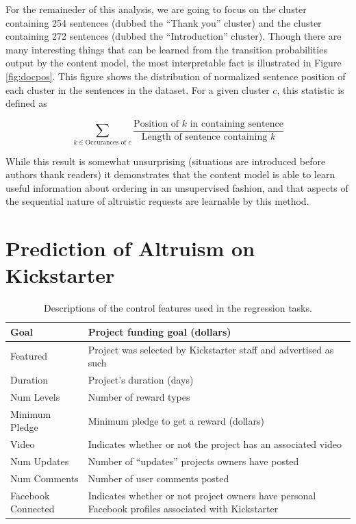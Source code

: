 \documentclass[letterpaper]{article}
\begin{document}
For the remaineder of this analysis, we are going to focus on the cluster containing 254 sentences (dubbed the ``Thank you'' cluster) and the cluster containing 272 sentences (dubbed the ``Introduction'' cluster). Though there are many interesting things that can be learned from the transition probabilities output by the content model, the most interpretable fact is illustrated in Figure \ref{fig:docpos}. This figure shows the distribution of normalized sentence position of each cluster in the sentences in the dataset. For a given cluster $c$, this statistic is defined as

\begin{equation} \label{eq:sentpos}
\sum\limits_{k \in \text{Occurances of $c$}} \frac{\text{Position of $k$ in containing sentence}}{\text{Length of sentence containing $k$}}
\end{equation}

While this result is somewhat unsurprising (situations are introduced before authors thank readers) it demonstrates that the content model is able to learn useful information about ordering in an unsupervised fashion, and that aspects of the sequential nature of altruistic requests are learnable by this method.

\section{Prediction of Altruism on Kickstarter}
\begin{table}
\centering
\begin{tabular}{|l|L{5cm}|}
\hline
Goal & Project funding goal (dollars) \\\hline
Featured & Project was selected by Kickstarter staff and advertised as such\\\hline
Duration & Project's duration (days) \\\hline
Num Levels & Number of reward types \\\hline
Minimum Pledge & Minimum pledge to get a reward (dollars)\\\hline
Video & Indicates whether or not the project has an associated video \\\hline
Num Updates & Number of ``updates'' projects owners have posted \\\hline
Num Comments & Number of user comments posted \\\hline
Facebook Connected & Indicates whether or not project owners have personal Facebook profiles associated with Kickstarter\\
\hline
\end{tabular}
\caption{Descriptions of the control features used in the regression tasks.}
\label{tab:controls}
\end{table}
\end{document}
